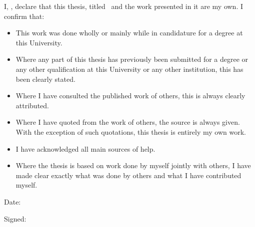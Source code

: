 
I, \showfullauthor, declare that this thesis, titled \showtitle\
 and the work presented in it are my own. I confirm that:
\begin{itemize}
\item This work was done wholly or mainly while in candidature for a \@degree degree at this University.
\item Where any part of this thesis has previously been submitted for a degree or any other qualification at this University or any other institution, this has been clearly stated.
\item Where I have consulted the published work of others, this is always clearly attributed.
\item Where I have quoted from the work of others, the source is always given. With the exception of such quotations, this thesis is entirely my own work.
\item I have acknowledged all main sources of help.
\item Where the thesis is based on work done by myself jointly with others, I have made
clear exactly what was done by others and what I have contributed myself.
\end{itemize}

\vspace{4cm}

\noindent
Date:
\vspace{1cm}

\noindent
Signed:
  
